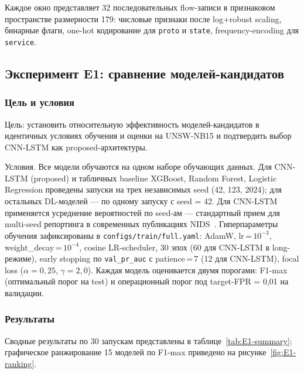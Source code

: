 Каждое окно представляет 32 последовательных flow-записи в
признаковом пространстве размерности 179: числовые признаки после
log+robust scaling, бинарные флаги, one-hot кодирование для
\texttt{proto} и \texttt{state}, frequency-encoding для
\texttt{service}.

\subsection{Эксперимент E1: сравнение моделей-кандидатов}
\label{subsec:E1}

\subsubsection{Цель и условия}

Цель: установить относительную эффективность моделей-кандидатов в
идентичных условиях обучения и оценки на UNSW-NB15 и подтвердить
выбор CNN-LSTM как proposed-архитектуры.

Условия. Все модели обучаются на одном наборе обучающих данных.
Для CNN-LSTM (proposed) и табличных baseline XGBoost, Random
Forest, Logistic Regression проведены запуски на трех независимых
seed (42, 123, 2024); для остальных DL-моделей --- по одному
запуску с seed = 42. Для CNN-LSTM применяется усреднение
вероятностей по seed-ам --- стандартный прием для multi-seed
репортинга в современных публикациях
NIDS~\cite{ahmad2021nids}. Гиперпараметры обучения зафиксированы в
\texttt{configs/train/full.yaml}: AdamW, lr\,=\,$10^{-3}$,
weight\_decay\,=\,$10^{-4}$, cosine LR-scheduler, 30 эпох
(60 для CNN-LSTM в long-режиме), early stopping по
\texttt{val\_pr\_auc} с patience\,=\,7 (12 для CNN-LSTM), focal
loss ($\alpha = 0{,}25$, $\gamma = 2{,}0$). Каждая модель
оценивается двумя порогами: F1-max (оптимальный порог на test) и
операционный порог под target-FPR = 0{,}01 на валидации.

\subsubsection{Результаты}

Сводные результаты по 30 запускам представлены в
таблице~\ref{tab:E1-summary}; графическое ранжирование 15 моделей по
F1-max приведено на рисунке~\ref{fig:E1-ranking}.

